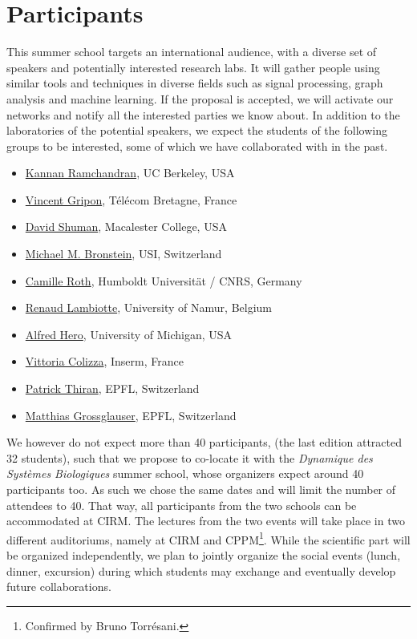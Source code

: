 \documentclass[a4paper]{scrartcl}
\begin{document}
\section{Participants}

This summer school targets an international audience, with a diverse set of
speakers and potentially interested research labs. It will gather people using
similar tools and techniques in diverse fields such as signal processing, graph
analysis and machine learning. If the proposal is accepted, we will activate our
networks and notify all the interested parties we know about. In addition to
the laboratories of the potential speakers, we expect the students of the
following groups to be interested, some of which we have collaborated with in
the past.
\begin{itemize}
	\setlength{\itemsep}{0pt} \setlength{\parskip}{0pt}
	\item \href{https://www.eecs.berkeley.edu/~kannanr/}
		{Kannan Ramchandran}, UC Berkeley, USA
	\item \href{http://www.vincent-gripon.com/}
		{Vincent Gripon}, Télécom Bretagne, France
	\item \href{http://www.macalester.edu/~dshuman1/}
		{David Shuman}, Macalester College, USA
	\item \href{http://www.inf.usi.ch/bronstein/}
		{Michael M. Bronstein}, USI, Switzerland
	\item \href{http://camille.roth.free.fr/index.php}
		{Camille Roth}, Humboldt Universität / CNRS, Germany
	\item \href{http://xn.unamur.be/}
		{Renaud Lambiotte}, University of Namur, Belgium
	\item \href{https://web.eecs.umich.edu/~hero/}
		{Alfred Hero}, University of Michigan, USA
	\item \href{http://www.epicx-lab.com/vittoria-colizza.html}
		{Vittoria Colizza}, Inserm, France
	\item \href{http://people.epfl.ch/patrick.thiran}
		{Patrick Thiran}, EPFL, Switzerland
	\item \href{http://icapeople.epfl.ch/grossglauser/}
		{Matthias Grossglauser}, EPFL, Switzerland
\end{itemize}

We however do not expect more than 40 participants, (the last edition attracted
32 students), such that we propose to co-locate it with the \textit{Dynamique des
Systèmes Biologiques} summer school, whose organizers expect around 40
participants too. As such we chose the same dates and will limit the number of
attendees to 40. That way, all participants from the two schools can be
accommodated at CIRM. The lectures from the two events will take place in two
different auditoriums, namely at CIRM and CPPM\footnote{Confirmed by Bruno
Torrésani.}. While the scientific part will be organized independently, we plan
to jointly organize the social events (lunch, dinner, excursion) during which
students may exchange and eventually develop future collaborations.
\end{document}

